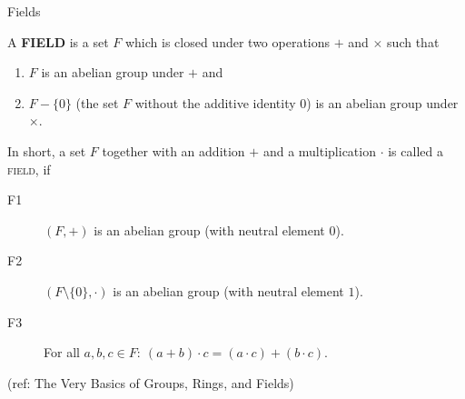 \begin{frame}{Fields}

\begin{Definition} A {\bf FIELD} is a set $F$ which is closed under two operations $+$ and $\times$ such that
\begin{enumerate} \item $F$ is an abelian group under $+$
and
\item $F - \{ 0 \}$ (the set $F$ without the additive identity $0$) is an abelian group under $\times$.
\end{enumerate}
\end{Definition}

In short, a set $F$ together with an addition $+$ and a
multiplication $\cdot$ is called a \textsc{field}, if
\begin{description}
\item[F1] $(F,+)$ is an abelian group (with neutral element $0$).
\item[F2] $(F\setminus\{0\},\cdot)$ is an abelian group (with neutral element $1$).
\item[F3] For all $a,b,c \in F:\ (a+b)\cdot c= (a\cdot c) + (b\cdot c).$
\end{description}



\tiny{(ref: The Very Basics of Groups, Rings, and Fields)}

\end{frame}

